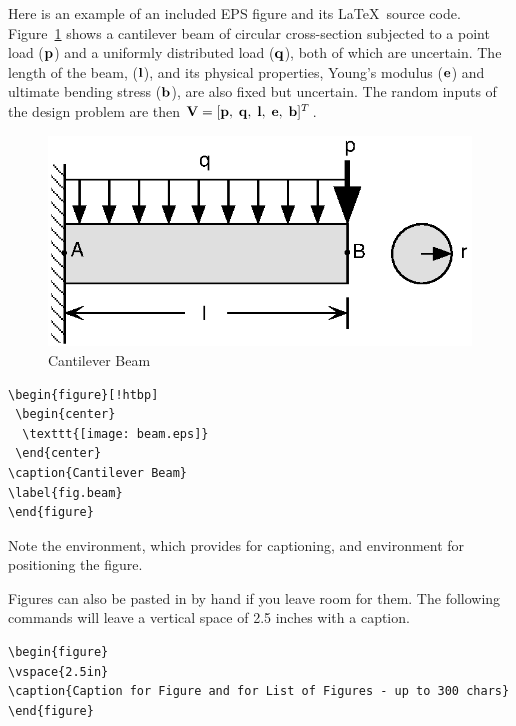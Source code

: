Here is an example of an included EPS figure and its \LaTeX\ source code.
Figure~\ref{fig.beam} shows a cantilever beam of circular cross-section
subjected to a point load ($\mathbf{p}$) and a uniformly distributed load
($\mathbf{q}$), both of which are uncertain.
The length of the beam, ($\mathbf{l}$), and its physical properties,
Young's modulus ($\mathbf{e}$) and ultimate bending stress ($\mathbf{b}$), are also
fixed but uncertain.
The random inputs of the design problem are then $\mathbf{V}=[\mathbf{p}, \;
\mathbf{q}, \; \mathbf{l}, \; \mathbf{e}, \; \mathbf{b} ]^T$.
\begin{figure}[!htbp]
 \begin{center}
  \includegraphics[clip=true]{images/beam.eps}
 \end{center}
\caption{Cantilever Beam}
\label{fig.beam}
\end{figure}
\begin{verbatim}
\begin{figure}[!htbp]
 \begin{center}
  \texttt{[image: beam.eps]}
 \end{center}
\caption{Cantilever Beam}
\label{fig.beam}
\end{figure}
\end{verbatim}
Note the  environment, which provides for captioning, and  environment for positioning the figure.

Figures can also be pasted in by hand if you leave room for them.
The following commands will leave a vertical space of 2.5 inches with a caption.
\begin{verbatim}
\begin{figure}
\vspace{2.5in}
\caption{Caption for Figure and for List of Figures - up to 300 chars}
\end{figure}
\end{verbatim}
